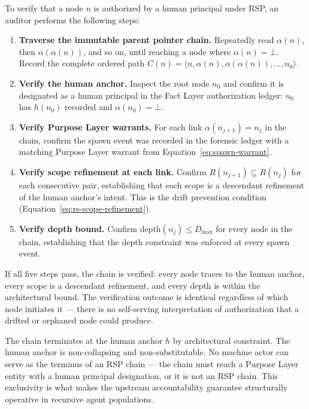 To verify that a node $n$ is authorized by a human principal under RSP, an auditor performs the following steps:

\begin{enumerate}
    \item[(V1)] \textbf{Traverse the immutable parent pointer chain.} Repeatedly read $\alpha(n)$, then $\alpha(\alpha(n))$, and so on, until reaching a node where $\alpha(n) = \bot$. Record the complete ordered path $C(n) = \langle n, \alpha(n), \alpha(\alpha(n)), \ldots, n_0 \rangle$.

    \item[(V2)] \textbf{Verify the human anchor.} Inspect the root node $n_0$ and confirm it is designated as a human principal in the Fact Layer authorization ledger: $n_0$ has $h(n_0)$ recorded and $\alpha(n_0) = \bot$.

    \item[(V3)] \textbf{Verify Purpose Layer warrants.} For each link $\alpha(n_{j+1}) = n_j$ in the chain, confirm the spawn event was recorded in the forensic ledger with a matching Purpose Layer warrant from Equation~\ref{eq:spawn-warrant}.

    \item[(V4)] \textbf{Verify scope refinement at each link.} Confirm $R(n_{j+1}) \subseteq R(n_j)$ for each consecutive pair, establishing that each scope is a descendant refinement of the human anchor's intent. This is the drift prevention condition (Equation~\ref{eq:rs-scope-refinement}).

    \item[(V5)] \textbf{Verify depth bound.} Confirm $\text{depth}(n_j) \leq D_{\max}$ for every node in the chain, establishing that the depth constraint was enforced at every spawn event.
\end{enumerate}

If all five steps pass, the chain is verified: every node traces to the human anchor, every scope is a descendant refinement, and every depth is within the architectural bound. The verification outcome is identical regardless of which node initiates it — there is no self-serving interpretation of authorization that a drifted or orphaned node could produce.

The chain terminates at the human anchor $h$ by architectural constraint. The human anchor is non-collapsing and non-substitutable. No machine actor can serve as the terminus of an RSP chain — the chain must reach a Purpose Layer entity with a human principal designation, or it is not an RSP chain. This exclusivity is what makes the \bxthree{} upstream accountability guarantee structurally operative in recursive agent populations.

